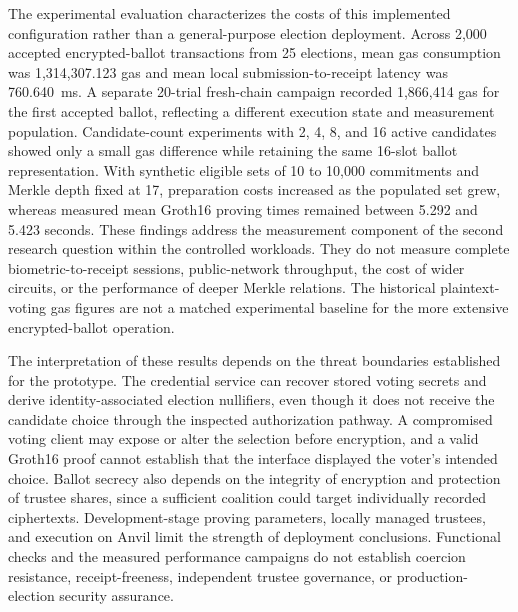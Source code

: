 The experimental evaluation characterizes the costs of this implemented
configuration rather than a general-purpose election deployment. Across
2,000 accepted encrypted-ballot transactions from 25 elections, mean gas
consumption was 1,314,307.123 gas and mean local submission-to-receipt
latency was 760.640~ms. A separate 20-trial fresh-chain campaign recorded
1,866,414 gas for the first accepted ballot, reflecting a different
execution state and measurement population. Candidate-count experiments
with 2, 4, 8, and 16 active candidates showed only a small gas difference
while retaining the same 16-slot ballot representation. With synthetic
eligible sets of 10 to 10,000 commitments and Merkle depth fixed at 17,
preparation costs increased as the populated set grew, whereas measured
mean Groth16 proving times remained between 5.292 and 5.423 seconds. These
findings address the measurement component of the second research question
within the controlled workloads. They do not measure complete
biometric-to-receipt sessions, public-network throughput, the cost of wider
circuits, or the performance of deeper Merkle relations. The historical
plaintext-voting gas figures are not a matched experimental baseline for
the more extensive encrypted-ballot operation.

The interpretation of these results depends on the threat boundaries
established for the prototype. The credential service can recover stored
voting secrets and derive identity-associated election nullifiers, even
though it does not receive the candidate choice through the inspected
authorization pathway. A compromised voting client may expose or alter the
selection before encryption, and a valid Groth16 proof cannot establish
that the interface displayed the voter's intended choice. Ballot secrecy
also depends on the integrity of encryption and protection of trustee
shares, since a sufficient coalition could target individually recorded
ciphertexts. Development-stage proving parameters, locally managed trustees,
and execution on Anvil limit the strength of deployment conclusions.
Functional checks and the measured performance campaigns do not establish
coercion resistance, receipt-freeness, independent trustee governance, or
production-election security assurance.

